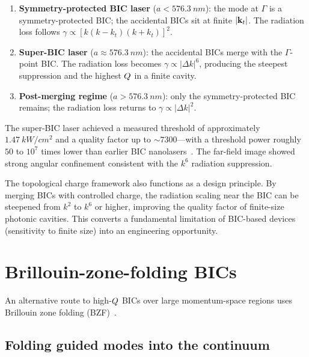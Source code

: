 \begin{enumerate}
 \item \textbf{Symmetry-protected BIC laser} ($a < \SI{576.3}{nm}$):
 the mode at $\Gamma$ is a symmetry-protected BIC; the accidental
 BICs sit at finite $|\mathbf{k}_t|$. The radiation loss follows
 $\gamma \propto [k(k - k_t)(k + k_t)]^2$.

 \item \textbf{Super-BIC laser} ($a \approx \SI{576.3}{nm}$):
 the accidental BICs merge with the $\Gamma$-point BIC. The
   radiation loss becomes $\gamma \propto |\Delta k|^6$, producing the steepest
 suppression and the highest $Q$ in a finite cavity.

 \item \textbf{Post-merging regime} ($a > \SI{576.3}{nm}$):
 only the symmetry-protected BIC remains; the radiation loss
   returns to $\gamma \propto |\Delta k|^2$.
\end{enumerate}

The super-BIC laser achieved a measured threshold of approximately
$\SI{1.47}{kW/cm^2}$ and a quality factor up to $\sim 7300$---with a
threshold power roughly $50$ to $10^7$ times lower than earlier BIC
nanolasers~\cite{hwang2021ultralow}. The far-field image showed strong
angular confinement consistent with the $k^6$ radiation suppression.

\begin{takeaway}
The topological charge framework also functions as a design principle.
By merging BICs with controlled charge, the
radiation scaling near the BIC can be steepened from $k^2$ to $k^6$ or
higher, improving the quality factor of finite-size
photonic cavities. This converts a fundamental limitation of BIC-based
devices (sensitivity to finite size) into an engineering opportunity.
\end{takeaway}


\section{Brillouin-zone-folding BICs}
\label{sec:bzf-bic}

An alternative route to high-$Q$ BICs over large momentum-space
regions uses Brillouin zone folding (BZF)~\cite{wang2023brillouin}.

\subsection{Folding guided modes into the continuum}
\label{ssec:bzf-mechanism}

